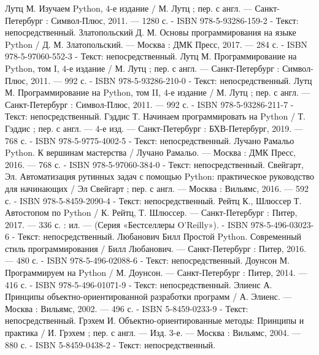 
\begin{thebibliography}{9}

     Лутц М. Изучаем Python, 4-е издание / М. Лутц ; пер. с англ. — Санкт-Петербург : Символ-Плюс, 2011. — 1280 с. - ISBN 978-5-93286-159-2  - Текст: непосредственный.
     Златопольский Д. М. Основы программирования на языке Python / Д. М. Златопольский. — Москва : ДМК Пресс, 2017. — 284 с. - ISBN 978-5-97060-552-3 - Текст: непосредственный.
     Лутц М. Программирование на Python, том I, 4-е издание / М. Лутц ; пер. с англ. — Санкт-Петербург : Символ-Плюс, 2011. — 992 с. - ISBN 978-5-93286-210-0 - Текст: непосредственный.
     Лутц М. Программирование на Python, том II, 4-е издание / М. Лутц ; пер. с англ. — Санкт-Петербург : Символ-Плюс, 2011. — 992 с. - ISBN 978-5-93286-211-7 - Текст: непосредственный.
     Гэддис Т. Начинаем программировать на Python / Т. Гэддис ; пер. с англ. — 4-е изд. — Санкт-Петербург : БХВ-Петербург, 2019. — 768 с. - ISBN 978-5-9775-4002-5 - Текст: непосредственный.
     Лучано Рамальо Python. К вершинам мастерства / Лучано Рамальо. — Москва : ДМК Пресс, 2016. — 768 с. - ISBN 978-5-97060-384-0 - Текст: непосредственный.
     Свейгарт, Эл. Автоматизация рутинных задач с помощью Python: практическое руководство для начинающих / Эл Свейгарт ; пер. с англ. — Москва : Вильямс, 2016. — 592 с. - ISBN 978-5-8459-2090-4 - Текст: непосредственный.
     Рейтц К., Шлюссер Т. Автостопом по Python / К. Рейтц, Т. Шлюссер. — Санкт-Петербург : Питер, 2017. — 336 с. : ил. — (Серия «Бестселлеры O’Reilly»). - ISBN 978-5-496-03023-6 - Текст: непосредственный.
     Любанович Билл Простой Python. Современный стиль программирования / Билл Любанович. — Санкт-Петербург : Питер, 2016. — 480 с. - ISBN 978-5-496-02088-6 - Текст: непосредственный.
     Доунсон М. Программируем на Python / М. Доунсон. — Санкт-Петербург : Питер, 2014. — 416 с. - ISBN 978-5-496-01071-9 - Текст: непосредственный.
     Элиенс А. Принципы объектно-ориентированной разработки программ / А. Элиенс. — Москва : Вильямс, 2002. — 496 с. - ISBN 5-8459-0233-9 - Текст: непосредственный.
     Грэхем И. Объектно-ориентированные методы: Принципы и практика / И. Грэхем ; пер. с англ. — Изд. 3-е. — Москва : Вильямс, 2004. — 880 с. - ISBN 5-8459-0438-2 - Текст: непосредственный.

\end{thebibliography}

